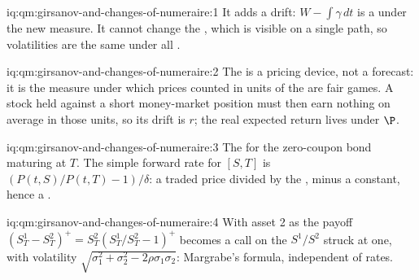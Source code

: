 \begin{solution}{iq:qm:girsanov-and-changes-of-numeraire:1}
It adds a drift: $W - \int\gamma\,dt$ is a  under the new measure. It cannot change the , which is visible on a single path, so volatilities are the same under all .
\end{solution}

\begin{solution}{iq:qm:girsanov-and-changes-of-numeraire:2}
The  is a pricing device, not a forecast: it is the measure under which prices
counted in units of the  are fair games. A stock held against a short
money-market position must then earn nothing on average in those units, so its drift is $r$; the real
expected return lives under $\P$.
\end{solution}

\begin{solution}{iq:qm:girsanov-and-changes-of-numeraire:3}
The  for the zero-coupon bond maturing at $T$. The simple forward rate for
$[S, T]$ is $(P(t,S)/P(t,T) - 1)/\delta$: a traded price divided by the , minus a constant, hence a
.
\end{solution}

\begin{solution}{iq:qm:girsanov-and-changes-of-numeraire:4}
With asset 2 as  the payoff $(S^1_T - S^2_T)^+ = S^2_T(S^1_T/S^2_T - 1)^+$ becomes a call on the
 $S^1/S^2$ struck at one, with volatility $\sqrt{\sigma_1^2 + \sigma_2^2 - 2\rho\sigma_1\sigma_2}$: Margrabe's
formula, independent of rates.
\end{solution}

